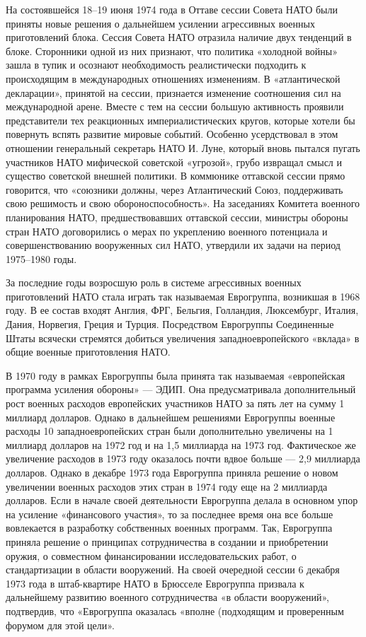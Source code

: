 \documentclass[12pt, a4paper, openany]{book}
\begin{document}
На состоявшейся 18–19 июня 1974 года в Оттаве сессии Совета НАТО были приняты новые решения о дальнейшем усилении агрессивных военных приготовлений блока. Сессия Совета НАТО отразила наличие двух тенденций в блоке. Сторонники одной из них признают, что политика «холодной войны» зашла в тупик и осознают необходимость реалистически подходить к происходящим в международных отношениях изменениям. В «атлантической декларации», принятой на сессии, признается изменение соотношения сил на международной арене. Вместе с тем на сессии большую активность проявили представители тех реакционных империалистических кругов, которые хотели бы повернуть вспять развитие мировые событий. Особенно усердствовал в этом отношении генеральный секретарь НАТО И. Луне, который вновь пытался пугать участников НАТО мифической советской «угрозой», грубо извращал смысл и существо советской внешней политики. В коммюнике оттавской сессии прямо говорится, что «союзники должны, через Атлантический Союз, поддерживать свою решимость и свою обороноспособность». На заседаниях Комитета военного планирования НАТО, предшествовавших оттавской сессии, министры обороны стран НАТО договорились о мерах по укреплению военного потенциала и совершенствованию вооруженных сил НАТО, утвердили их задачи на период 1975–1980 годы.
	
	За последние годы возросшую роль в системе агрессивных военных приготовлений НАТО стала играть так называемая Еврогруппа, возникшая в 1968 году. В ее состав входят Англия, ФРГ, Бельгия, Голландия, Люксембург, Италия, Дания, Норвегия, Греция и Турция. Посредством Еврогруппы Соединенные Штаты всячески стремятся добиться увеличения западноевропейского «вклада» в общие военные приготовления НАТО.
	
	В 1970 году в рамках Еврогруппы была принята так называемая «европейская программа усиления обороны» — ЭДИП. Она предусматривала дополнительный рост военных расходов европейских участников НАТО за пять лет на сумму 1 миллиард долларов. Однако в дальнейшем решениями Еврогруппы военные расходы 10 западноевропейских стран были дополнительно увеличены на 1 миллиард долларов на 1972 год и на 1,5 миллиарда на 1973 год. Фактическое же увеличение расходов в 1973 году оказалось почти вдвое больше — 2,9 миллиарда долларов. Однако в декабре 1973 года Еврогруппа приняла решение о новом увеличении военных расходов этих стран в 1974 году еще на 2 миллиарда долларов. Если в начале своей деятельности Еврогруппа делала в основном упор на усиление «финансового участия», то за последнее время она все больше вовлекается в разработку собственных военных программ. Так, Еврогруппа приняла решение о принципах сотрудничества в создании и приобретении оружия, о совместном финансировании исследовательских работ, о стандартизации в области вооружений. На своей очередной сессии 6 декабря 1973 года в штаб-квартире НАТО в Брюсселе Еврогруппа призвала к дальнейшему развитию военного сотрудничества «в области вооружений», подтвердив, что «Еврогруппа оказалась «вполне (подходящим и проверенным форумом для этой цели».
	
\end{document}
